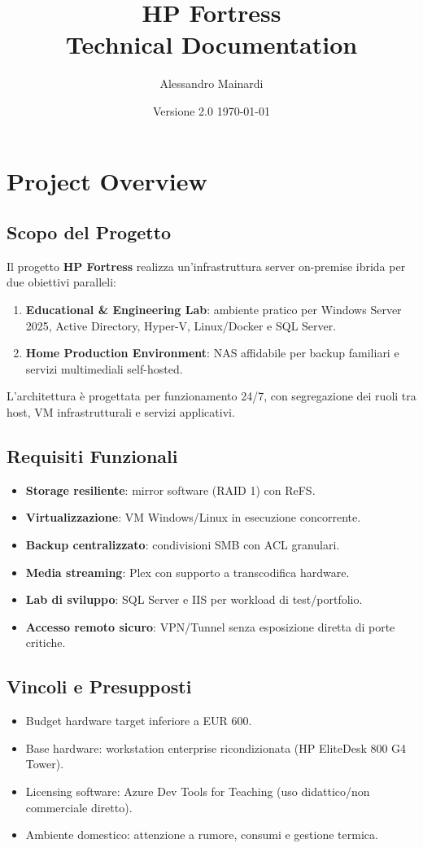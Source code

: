 \documentclass[11pt,a4paper]{article}
\title{HP Fortress\\\large Technical Documentation}
\author{Alessandro Mainardi}
\date{Versione 2.0 \textbar{} \today}
\begin{document}
\maketitle
\tableofcontents
\newpage

\section{Project Overview}

\subsection{Scopo del Progetto}
Il progetto \textbf{HP Fortress} realizza un'infrastruttura server on-premise ibrida per due obiettivi paralleli:
\begin{enumerate}
  \item \textbf{Educational \& Engineering Lab}: ambiente pratico per Windows Server 2025, Active Directory, Hyper-V, Linux/Docker e SQL Server.
  \item \textbf{Home Production Environment}: NAS affidabile per backup familiari e servizi multimediali self-hosted.
\end{enumerate}

L'architettura è progettata per funzionamento 24/7, con segregazione dei ruoli tra host, VM infrastrutturali e servizi applicativi.

\subsection{Requisiti Funzionali}
\begin{itemize}
  \item \textbf{Storage resiliente}: mirror software (RAID 1) con ReFS.
  \item \textbf{Virtualizzazione}: VM Windows/Linux in esecuzione concorrente.
  \item \textbf{Backup centralizzato}: condivisioni SMB con ACL granulari.
  \item \textbf{Media streaming}: Plex con supporto a transcodifica hardware.
  \item \textbf{Lab di sviluppo}: SQL Server e IIS per workload di test/portfolio.
  \item \textbf{Accesso remoto sicuro}: VPN/Tunnel senza esposizione diretta di porte critiche.
\end{itemize}

\subsection{Vincoli e Presupposti}
\begin{itemize}
  \item Budget hardware target inferiore a EUR 600.
  \item Base hardware: workstation enterprise ricondizionata (HP EliteDesk 800 G4 Tower).
  \item Licensing software: Azure Dev Tools for Teaching (uso didattico/non commerciale diretto).
  \item Ambiente domestico: attenzione a rumore, consumi e gestione termica.
\end{itemize}
\end{document}
